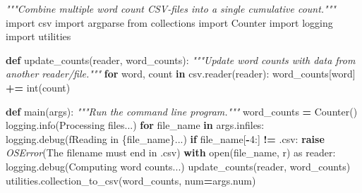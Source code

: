 \documentclass[
]{krantz}
\makeatletter
\newenvironment{Shaded}{\begin{snugshade}}{\end{snugshade}}
\newcommand{\BuiltInTok}[1]{#1}
\newcommand{\CommentTok}[1]{\textcolor[rgb]{0.56,0.35,0.01}{\textit{#1}}}
\newcommand{\ControlFlowTok}[1]{\textcolor[rgb]{0.13,0.29,0.53}{\textbf{#1}}}
\newcommand{\DecValTok}[1]{\textcolor[rgb]{0.00,0.00,0.81}{#1}}
\newcommand{\ImportTok}[1]{#1}
\newcommand{\KeywordTok}[1]{\textcolor[rgb]{0.13,0.29,0.53}{\textbf{#1}}}
\newcommand{\NormalTok}[1]{#1}
\newcommand{\OperatorTok}[1]{\textcolor[rgb]{0.81,0.36,0.00}{\textbf{#1}}}
\newcommand{\PreprocessorTok}[1]{\textcolor[rgb]{0.56,0.35,0.01}{\textit{#1}}}
\newcommand{\SpecialCharTok}[1]{\textcolor[rgb]{0.00,0.00,0.00}{#1}}
\newcommand{\SpecialStringTok}[1]{\textcolor[rgb]{0.31,0.60,0.02}{#1}}
\newcommand{\StringTok}[1]{\textcolor[rgb]{0.31,0.60,0.02}{#1}}
\newenvironment{kframe}{%
\medskip{}
\setlength{\fboxsep}{.8em}
 \def\at@end@of@kframe{}%
 \ifinner\ifhmode%
  \def\at@end@of@kframe{\end{minipage}}%
  \begin{minipage}{\columnwidth}%
 \fi\fi%
 \def\FrameCommand##1{\hskip\@totalleftmargin \hskip-\fboxsep
 \colorbox{shadecolor}{##1}\hskip-\fboxsep
     \hskip-\linewidth \hskip-\@totalleftmargin \hskip\columnwidth}%
 \MakeFramed {\advance\hsize-\width
   \@totalleftmargin\z@ \linewidth\hsize
   \@setminipage}}%
 {\par\unskip\endMakeFramed%
 \at@end@of@kframe}
\renewenvironment{Shaded}{\begin{kframe}}{\end{kframe}}
\makeatother
\begin{document}
\begin{Shaded}
\begin{Highlighting}[]
\CommentTok{"""Combine multiple word count CSV{-}files into a single cumulative count."""}
\ImportTok{import}\NormalTok{ csv}
\ImportTok{import}\NormalTok{ argparse}
\ImportTok{from}\NormalTok{ collections }\ImportTok{import}\NormalTok{ Counter}
\ImportTok{import}\NormalTok{ logging}
\ImportTok{import}\NormalTok{ utilities}


\KeywordTok{def}\NormalTok{ update\_counts(reader, word\_counts):}
    \CommentTok{"""Update word counts with data from another reader/file."""}
    \ControlFlowTok{for}\NormalTok{ word, count }\KeywordTok{in}\NormalTok{ csv.reader(reader):}
\NormalTok{        word\_counts[word] }\OperatorTok{+=} \BuiltInTok{int}\NormalTok{(count)}

\KeywordTok{def}\NormalTok{ main(args):}
    \CommentTok{"""Run the command line program."""}
\NormalTok{    word\_counts }\OperatorTok{=}\NormalTok{ Counter()}
\NormalTok{    logging.info(}\StringTok{\textquotesingle{}Processing files...\textquotesingle{}}\NormalTok{)}
    \ControlFlowTok{for}\NormalTok{ file\_name }\KeywordTok{in}\NormalTok{ args.infiles:}
\NormalTok{        logging.debug(}\SpecialStringTok{f\textquotesingle{}Reading in }\SpecialCharTok{\{}\NormalTok{file\_name}\SpecialCharTok{\}}\SpecialStringTok{...\textquotesingle{}}\NormalTok{)}
        \ControlFlowTok{if}\NormalTok{ file\_name[}\OperatorTok{{-}}\DecValTok{4}\NormalTok{:] }\OperatorTok{!=} \StringTok{\textquotesingle{}.csv\textquotesingle{}}\NormalTok{:}
            \ControlFlowTok{raise} \PreprocessorTok{OSError}\NormalTok{(}\StringTok{\textquotesingle{}The filename must end in \textasciigrave{}.csv\textasciigrave{}\textquotesingle{}}\NormalTok{)}
        \ControlFlowTok{with} \BuiltInTok{open}\NormalTok{(file\_name, }\StringTok{\textquotesingle{}r\textquotesingle{}}\NormalTok{) }\ImportTok{as}\NormalTok{ reader:}
\NormalTok{            logging.debug(}\StringTok{\textquotesingle{}Computing word counts...\textquotesingle{}}\NormalTok{)}
\NormalTok{            update\_counts(reader, word\_counts)}
\NormalTok{    utilities.collection\_to\_csv(word\_counts, num}\OperatorTok{=}\NormalTok{args.num)}


\end{Highlighting}
\end{Shaded}
\end{document}
